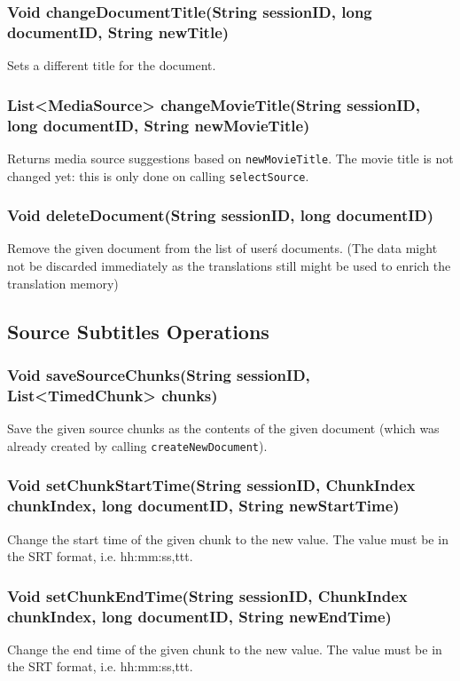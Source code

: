{\subsubsection{Void changeDocumentTitle(String sessionID, long documentID, String newTitle)}
Sets a different title for the document.

\subsubsection{List<MediaSource> changeMovieTitle(String sessionID, long documentID, String newMovieTitle)}
Returns media source suggestions based on {\tt newMovieTitle}.
The movie title is not changed yet:
this is only done on calling {\tt selectSource}.
     	
\subsubsection{Void deleteDocument(String sessionID, long documentID)}
Remove the given document from the list of user\'s documents.
(The data might not be discarded immediately
as the translations still might be used to enrich the translation memory)	 

\subsection{Source Subtitles Operations}

\subsubsection{Void saveSourceChunks(String sessionID, List<TimedChunk> chunks)}
Save the given source chunks as the contents of the given document
(which was already created by calling {\tt createNewDocument}).

\subsubsection{Void setChunkStartTime(String sessionID, ChunkIndex chunkIndex, long documentID, String newStartTime)}
Change the start time of the given chunk to the new value. The value must be in the SRT format, i.e. hh:mm:ss,ttt.

\subsubsection{Void setChunkEndTime(String sessionID, ChunkIndex chunkIndex, long documentID, String newEndTime)}
Change the end time of the given chunk to the new value. The value must be in the SRT format, i.e. hh:mm:ss,ttt.

}
